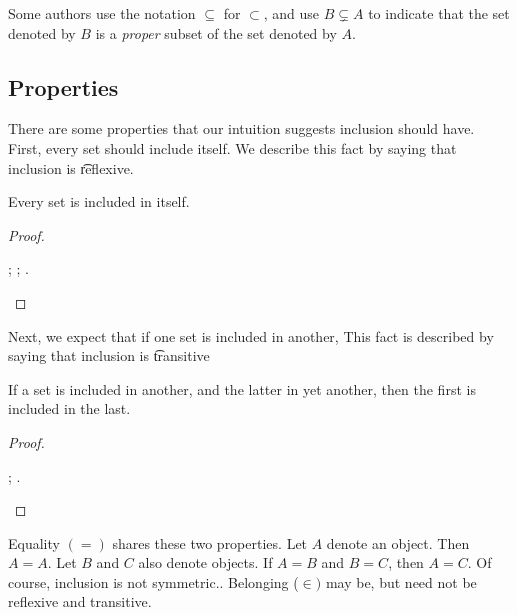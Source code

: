 Some authors use the notation $\subseteq$ for $\subset$, and use $B \subsetneq A$ to indicate that the set denoted by $B$ is a \textit{proper} subset of the set denoted by $A$.

\subsection*{Properties}


There are some properties that our intuition suggests inclusion should have.
First, every set should include itself.
We describe this fact by saying that inclusion is \t{reflexive}.
\begin{proposition}[Reflexive]
Every set is included in itself.\end{proposition}
\begin{proof}\begin{caccount}
;
;
.
\end{caccount}\end{proof}

Next, we expect that if one set is included in another,
This fact is described by saying that inclusion is \t{transitive}
\begin{proposition}[Transitive]
If a set is included in another, and the latter in yet another, then the first is included in the last.\end{proposition}
\begin{proof}\begin{caccount}
;
.
\end{caccount}\end{proof}


Equality $(=)$ shares these two properties.
Let $A$ denote an object.
Then $A = A$.
Let $B$ and $C$ also denote objects.
If $A = B$ and $B = C$, then $A = C$.
Of course, inclusion is not symmetric..
Belonging ($\in)$ may be, but need not be reflexive and transitive.

